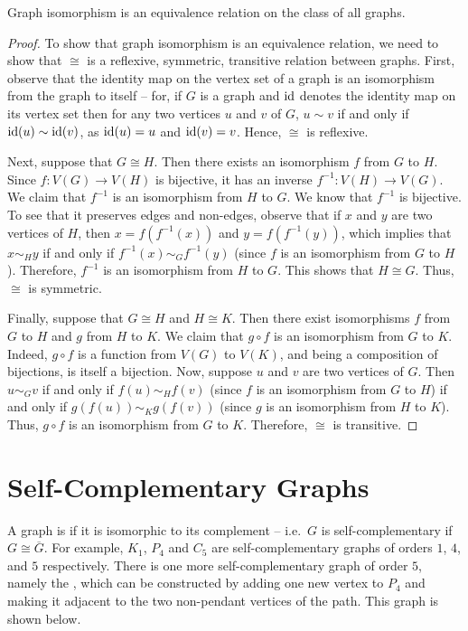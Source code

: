\begin{Theorem}
Graph isomorphism is an equivalence relation on the class of all graphs.
\end{Theorem}

\begin{proof}
To show that graph isomorphism is an equivalence relation, we need to show that $\cong$ is a reflexive, symmetric, transitive relation between graphs. First, observe that the identity map on the vertex set of a graph is an isomorphism from the graph to itself -- for, if $G$ is a graph and $\mathrm{id}$ denotes the identity map on its vertex set then for any two vertices $u$ and $v$ of $G$, $u \sim v$ if and only if $\mathrm{id}(u) \sim \mathrm{id}(v)$, as $\mathrm{id}(u) = u$ and $\mathrm{id}(v) = v$. Hence, $\cong$ is reflexive.

Next, suppose that $G \cong H$. Then there exists an isomorphism $f$ from $G$ to $H$. Since $f \colon V(G) \to V(H)$ is bijective, it has an inverse $f^{-1} \colon V(H) \to V(G)$. We claim that $f^{-1}$ is an isomorphism from $H$ to $G$. We know that $f^{-1}$ is bijective. To see that it preserves edges and non-edges, observe that if $x$ and $y$ are two vertices of $H$, then $x = f(f^{-1}(x))$ and $y = f(f^{-1}(y))$, which implies that $x \sim_H y$ if and only if $f^{-1}(x) \sim_G f^{-1}(y)$ (since $f$ is an isomorphism from $G$ to $H$). Therefore, $f^{-1}$ is an isomorphism from $H$ to $G$. This shows that $H \cong G$. Thus, $\cong$ is symmetric.

Finally, suppose that $G \cong H$ and $H \cong K$. Then there exist isomorphisms $f$ from $G$ to $H$ and $g$ from $H$ to $K$. We claim that $g \circ f$ is an isomorphism from $G$ to $K$. Indeed, $g \circ f$ is a function from $V(G)$ to $V(K)$, and being a composition of bijections, is itself a bijection. Now, suppose $u$ and $v$ are two vertices of $G$. Then $u \sim_G v$ if and only if $f(u) \sim_H f(v)$ (since $f$ is an isomorphism from $G$ to $H$) if and only if $g(f(u)) \sim_K g(f(v))$ (since $g$ is an isomorphism from $H$ to $K$). Thus, $g \circ f$ is an isomorphism from $G$ to $K$. Therefore, $\cong$ is transitive.
\end{proof}


\section{Self-Complementary Graphs}\label{sec:SC}

A graph is  if it is isomorphic to its complement -- i.e.\ $G$ is self-complementary if $G \cong \overline G$. For example, $K_1$, $P_4$ and $C_5$ are self-complementary graphs of orders $1$, $4$, and $5$ respectively. There is one more self-complementary graph of order $5$, namely the , which can be constructed by adding one new vertex to $P_4$ and making it adjacent to the two non-pendant vertices of the path. This graph is shown below.

